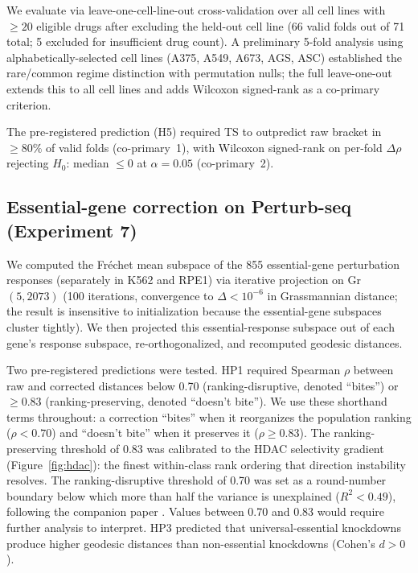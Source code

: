 \documentclass[11pt]{article}
\begin{document}
We evaluate via leave-one-cell-line-out cross-validation over all cell
lines with $\geq 20$ eligible drugs after excluding the held-out cell line
(66 valid folds out of 71 total; 5 excluded for insufficient drug count).
A preliminary 5-fold analysis using alphabetically-selected cell lines
(A375, A549, A673, AGS, ASC) established the rare/common regime distinction
with permutation nulls; the full leave-one-out extends this to all cell
lines and adds Wilcoxon signed-rank as a co-primary criterion.

The pre-registered prediction (H5) required TS to outpredict raw bracket
in $\geq 80\%$ of valid folds (co-primary~1), with Wilcoxon signed-rank on
per-fold $\Delta\rho$ rejecting $H_0$: median $\leq 0$ at $\alpha = 0.05$
(co-primary~2).

\subsection{Essential-gene correction on Perturb-seq (Experiment 7)}

We computed the Fr\'echet mean subspace of the 855 essential-gene
perturbation responses (separately in K562 and RPE1) via iterative
projection on Gr$(5, 2073)$ (100 iterations, convergence to
$\Delta < 10^{-6}$ in Grassmannian distance; the result is insensitive
to initialization because the essential-gene subspaces cluster tightly).
We then projected this essential-response subspace out of each gene's
response subspace, re-orthogonalized, and recomputed geodesic distances.

Two pre-registered predictions were tested.
HP1 required Spearman $\rho$ between raw and corrected distances below
0.70 (ranking-disruptive, denoted ``bites'') or $\geq 0.83$
(ranking-preserving, denoted ``doesn't bite''). We use these shorthand
terms throughout: a correction ``bites'' when it reorganizes the
population ranking ($\rho < 0.70$) and ``doesn't bite'' when it
preserves it ($\rho \geq 0.83$). The ranking-preserving threshold of
0.83 was calibrated to the HDAC selectivity gradient (Figure~\ref{fig:hdac}):
the finest within-class rank ordering that direction instability
resolves. The ranking-disruptive threshold of 0.70 was set as a
round-number boundary below which more than half the variance is
unexplained ($R^2 < 0.49$), following the companion paper
\citep{tower2026drug}. Values between 0.70 and 0.83 would require
further analysis to interpret.
HP3 predicted that universal-essential knockdowns produce higher geodesic
distances than non-essential knockdowns (Cohen's $d > 0$).
\end{document}
